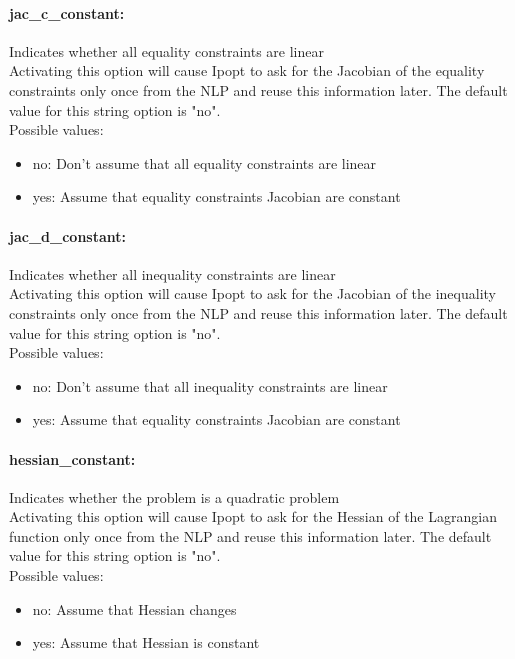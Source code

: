 \paragraph{jac\_c\_constant:}\label{opt:jac_c_constant} Indicates whether all equality constraints are linear \\
 Activating this option will cause Ipopt to ask
for the Jacobian of the equality constraints only
once from the NLP and reuse this information
later. The default value for this string option is "no".
\\ 
Possible values:
\begin{itemize}
   \item no: Don't assume that all equality constraints are
linear
   \item yes: Assume that equality constraints Jacobian are
constant
\end{itemize}

\paragraph{jac\_d\_constant:}\label{opt:jac_d_constant} Indicates whether all inequality constraints are linear \\
 Activating this option will cause Ipopt to ask
for the Jacobian of the inequality constraints
only once from the NLP and reuse this information
later. The default value for this string option is "no".
\\ 
Possible values:
\begin{itemize}
   \item no: Don't assume that all inequality constraints
are linear
   \item yes: Assume that equality constraints Jacobian are
constant
\end{itemize}

\paragraph{hessian\_constant:}\label{opt:hessian_constant} Indicates whether the problem is a quadratic problem \\
 Activating this option will cause Ipopt to ask
for the Hessian of the Lagrangian function only
once from the NLP and reuse this information
later. The default value for this string option is "no".
\\ 
Possible values:
\begin{itemize}
   \item no: Assume that Hessian changes
   \item yes: Assume that Hessian is constant
\end{itemize}

